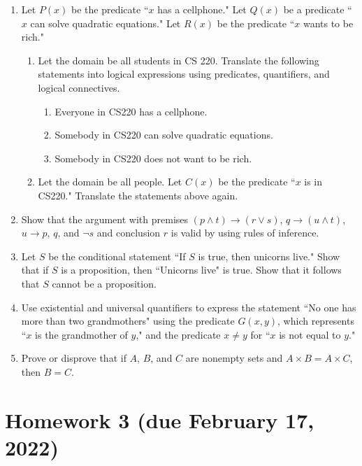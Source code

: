 \documentclass[11pt]{article}
\begin{document}
\begin{enumerate}
    \item Let $P(x)$ be the predicate ``$x$ has a cellphone." Let $Q(x)$ be a predicate ``$x$ can solve quadratic equations." Let $R(x)$ be the predicate ``$x$ wants to be rich."
    \begin{enumerate}
        \item Let the domain be all students in CS 220. Translate the following statements into logical expressions using predicates, quantifiers, and logical connectives.
        \begin{enumerate}
            \item Everyone in CS220 has a cellphone.
            \item Somebody in CS220 can solve quadratic equations.
            \item Somebody in CS220 does not want to be rich.
        \end{enumerate}
        \item Let the domain be all people. Let $C(x)$ be the predicate ``$x$ is in CS220." Translate the statements above again.
    \end{enumerate}
    \item Show that the argument with premises $(p \wedge t) \to (r \vee s)$, $q \to (u \wedge t)$, $u \to p$, $q$, and $\neg s$ and conclusion $r$ is valid by using rules of inference.
    \item Let $S$ be the conditional statement ``If $S$ is true, then unicorns live." Show that if $S$ is a proposition, then ``Unicorns live" is true. Show that it follows that $S$ cannot be a proposition.
    \item Use existential and universal quantifiers to express the statement ``No one has more than two grandmothers" using the predicate $G(x,y)$, which represents ``$x$ is the grandmother of $y$," and the predicate $x \neq y$ for ``$x$ is not equal to $y$."
    \item Prove or disprove that if $A$, $B$, and $C$ are nonempty sets and $A \times B = A \times C$, then $B = C$.
\end{enumerate}

\section*{Homework 3 (due February 17, 2022)}
\end{document}

